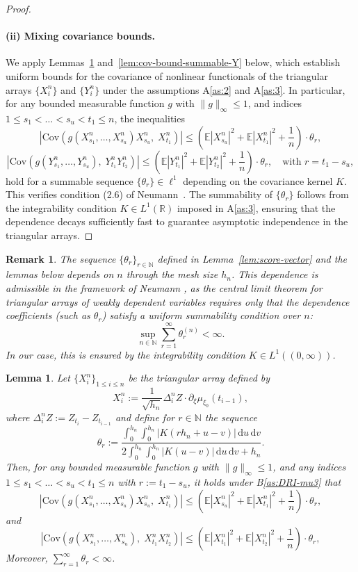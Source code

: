 \documentclass[a4paper,10pt,twoside]{article}
\newtheorem{lem}{Lemma}[section]
\newtheorem{remark}{Remark}[section]
\numberwithin{equation}{section}
\def\R{\mathbb{R}}
\def\N{\mathbb{N}}
\def\l{\left}
\def\r{\right}
\def\E{\mathbb{E}}
\def\Cov{\mathrm{Cov}}
\def\df{\mathrm{d}}
\begin{document}
\begin{proof}
\paragraph{(ii) Mixing covariance bounds.}
We apply Lemmas~\ref{lem:cov-bound-summable} and~\ref{lem:cov-bound-summable-Y} below, which establish uniform bounds for the covariance of nonlinear functionals of the triangular arrays $\{X_i^n\}$ and $\{Y_i^n\}$ under the assumptions A\ref{as:2} and A\ref{as:3}. In particular, for any bounded measurable function $g$ with $\|g\|_\infty \le 1$, and indices $1 \le s_1 < \dots < s_u < t_1 \le n$, the inequalities
\[
\l| \Cov\l( g(X_{s_1}^n, \dots, X_{s_u}^n) X_{s_u}^n,\; X_{t_1}^n \r) \r|
\le \l( \E|X_{s_u}^n|^2 + \E|X_{t_1}^n|^2 + \frac{1}{n} \r) \cdot \theta_{r},
\]
\[
\l| \Cov\l( g(Y_{s_1}^n, \dots, Y_{s_u}^n),\; Y_{t_1}^n Y_{t_2}^n \r) \r|
\le \l( \E|Y_{t_1}^n|^2 + \E|Y_{t_2}^n|^2 + \frac{1}{n} \r) \cdot \theta_{r},
\quad \text{with } r = t_1 - s_u,
\]
hold for a summable sequence $\{\theta_r\} \in \ell^1$ depending on the covariance kernel $K$. This verifies condition (2.6) of Neumann~\cite{n13}. The summability of $\{\theta_r\}$ follows from the integrability condition $K \in L^1(\R)$ imposed in A\ref{as:3}, ensuring that the dependence decays sufficiently fast to guarantee asymptotic independence in the triangular arrays.

\end{proof}

\begin{remark}
The sequence $\{\theta_r\}_{r \in \mathbb{N}}$ defined in Lemma~\ref{lem:score-vector} and the lemmas below depends on $n$ through the mesh size $h_n$.
This dependence is admissible in the framework of Neumann \cite{n13}, as the central limit theorem for triangular arrays of weakly dependent variables requires only that the dependence coefficients (such as $\theta_r$) satisfy a uniform summability condition over $n$:
\[
\sup_{n \in \mathbb{N}} \sum_{r=1}^\infty \theta_r^{(n)} < \infty.
\]
In our case, this is ensured by the integrability condition $K \in L^1((0,\infty))$.
\end{remark}

\begin{lem}
\label{lem:cov-bound-summable}
Let $\{X_i^n\}_{1 \le i \le n}$ be the triangular array defined by
\[
X_i^n := \frac{1}{\sqrt{h_n}} \Delta_i^n Z \cdot \partial_\xi \mu_{\xi_0}(t_{i-1}),
\]
where $\Delta_i^n Z := Z_{t_i} - Z_{t_{i-1}}$ and define for $r \in \N$ the sequence
\[
\theta_r := \frac{ \displaystyle \int_0^{h_n} \!\! \int_0^{h_n} |K(r h_n + u - v)|\,\df u\,\df v }{
\displaystyle 2 \int_0^{h_n} \!\! \int_0^{h_n} |K(u - v)|\,\df u\,\df v + h_n }.
\]
Then, for any bounded measurable function $g$ with $\|g\|_\infty \le 1$, 
and any indices $1 \le s_1 < \dots < s_u < t_1 \le n$ with $r := t_1 - s_u$, it holds under B\ref{as:DRI-mu3} that
\[
\l| \Cov\l( g(X_{s_1}^n, \dots, X_{s_u}^n) X_{s_u}^n,\; X_{t_1}^n \r) \r|
\le \l( \E|X_{s_u}^n|^2 + \E|X_{t_1}^n|^2 + \frac{1}{n} \r) \cdot \theta_r,  
\]
and 
\[
\l| \Cov\l( g(X_{s_1}^n, \dots, X_{s_u}^n),\; X_{t_1}^n X_{t_2}^n \r) \r|
\le \l( \E|X_{t_1}^n|^2 + \E|X_{t_2}^n|^2 + \frac{1}{n} \r) \cdot \theta_r,  
\]
Moreover, $\sum_{r=1}^\infty \theta_r < \infty$.
\end{lem}
\end{document}
